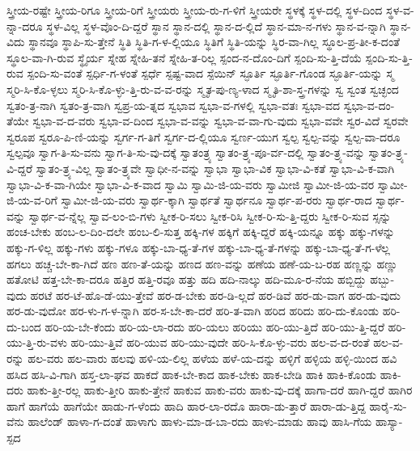 {ಸ್ತ್ರೀಯ-ರಷ್ಟೇ
ಸ್ತ್ರೀಯ-ರಿಗೂ
ಸ್ತ್ರೀಯ-ರಿಗೆ
ಸ್ತ್ರೀಯರು
ಸ್ತ್ರೀಯ-ರು-ಗ-ಳಿಗೆ
ಸ್ತ್ರೀಯರೇ
ಸ್ಥಳಕ್ಕೆ
ಸ್ಥಳ-ದಲ್ಲಿ
ಸ್ಥಳ-ದಿಂದ
ಸ್ಥಳ-ವ-ನ್ನಾ-ದರೂ
ಸ್ಥಳ-ವಿಲ್ಲ
ಸ್ಥಳ-ವೊಂ-ದಿ-ದ್ದರೆ
ಸ್ಥಾನ
ಸ್ಥಾನ-ದಲ್ಲಿ
ಸ್ಥಾನ-ದ-ಲ್ಲಿದೆ
ಸ್ಥಾನ-ಮಾ-ನ-ಗಳು
ಸ್ಥಾನ-ವ-ನ್ನಾಗಿ
ಸ್ಥಾನ-ವಿದು
ಸ್ಥಾನವೂ
ಸ್ಥಾಪಿ-ಸು-ತ್ತೇನೆ
ಸ್ಥಿತಿ
ಸ್ಥಿತಿ-ಗ-ಳ-ಲ್ಲಿಯೂ
ಸ್ಥಿತಿಗೆ
ಸ್ಥಿತಿ-ಯನ್ನು
ಸ್ಥಿರ-ವಾ-ಗಿಲ್ಲ
ಸ್ಥೂಲ-ಪ್ರ-ತೀ-ಕ-ದಂತೆ
ಸ್ಥೂಲ-ವಾ-ಗಿ-ರುವ
ಸ್ಥೈರ್ಯ
ಸ್ನೇಹ
ಸ್ನೇಹಿ-ತನೆ
ಸ್ನೇಹಿ-ತ-ರಿಲ್ಲ
ಸ್ಪಂದ-ನ-ದೊಂ-ದಿಗೆ
ಸ್ಪಂದಿ-ಸು-ತ್ತಿ-ದೆಯೆ
ಸ್ಪಂದಿ-ಸು-ತ್ತಿ-ರುವ
ಸ್ಪಂದಿ-ಸು-ವಂತೆ
ಸ್ಪರ್ಧಿ-ಗ-ಳಂತೆ
ಸ್ಪರ್ಧೆ
ಸ್ಪಷ್ಟ-ವಾದ
ಸ್ಪೆಯಿನ್
ಸ್ಫೂರ್ತಿ
ಸ್ಫೂರ್ತಿ-ಗೊಂಡ
ಸ್ಫೂರ್ತಿ-ಯನ್ನು
ಸ್ಮ
ಸ್ಮರಿ-ಸಿ-ಕೊ-ಳ್ಳಲು
ಸ್ಮರಿ-ಸಿ-ಕೊ-ಳ್ಳು-ತ್ತಿ-ರು-ವ-ವ-ರನ್ನು
ಸ್ಮೃತ-ಪು-ಣ್ಯ-ಳಾದ
ಸ್ಮೃತಿ-ಶಾ-ಸ್ತ್ರ-ಗಳನ್ನು
ಸ್ವ
ಸ್ವಂತ
ಸ್ವಚ್ಛಂದ
ಸ್ವತಂ-ತ್ರ-ನಾಗಿ
ಸ್ವತಂ-ತ್ರ-ವಾಗಿ
ಸ್ವಪ್ರ-ಯ-ತ್ನದ
ಸ್ವಭಾವ
ಸ್ವಭಾ-ವ-ಗಳಲ್ಲಿ
ಸ್ವಭಾ-ವತಃ
ಸ್ವಭಾ-ವದ
ಸ್ವಭಾ-ವ-ದಂ-ತೆಯೇ
ಸ್ವಭಾ-ವ-ದ-ವರು
ಸ್ವಭಾ-ವ-ದಿಂದ
ಸ್ವಭಾ-ವ-ವನ್ನು
ಸ್ವಭಾ-ವ-ವಾ-ಗು-ವುದು
ಸ್ವಭಾ-ವವೇ
ಸ್ವರ-ವಿದೆ
ಸ್ವರವೇ
ಸ್ವರೂಪ
ಸ್ವರೂ-ಪಿ-ಣಿ-ಯನ್ನು
ಸ್ವರ್ಗ-ಗ-ತಿಗೆ
ಸ್ವರ್ಗ-ದ-ಲ್ಲಿಯೂ
ಸ್ವರ್ಣ-ಯುಗ
ಸ್ವಲ್ಪ
ಸ್ವಲ್ಪ-ವನ್ನು
ಸ್ವಲ್ಪ-ವಾ-ದರೂ
ಸ್ವಲ್ಪವೂ
ಸ್ವಾಗ-ತಿ-ಸು-ವನು
ಸ್ವಾಗ-ತಿ-ಸು-ವು-ದಕ್ಕೆ
ಸ್ವಾತಂತ್ರ್ಯ
ಸ್ವಾತಂ-ತ್ರ್ಯ-ಪೂ-ರ್ವ-ದಲ್ಲಿ
ಸ್ವಾತಂ-ತ್ರ್ಯ-ವನ್ನು
ಸ್ವಾತಂ-ತ್ರ್ಯ-ವಿ-ದ್ದರೆ
ಸ್ವಾತಂ-ತ್ರ್ಯ-ವಿಲ್ಲ
ಸ್ವಾತಂ-ತ್ರ್ಯವೇ
ಸ್ವಾಧೀ-ನ-ವನ್ನು
ಸ್ವಾಭಾ
ಸ್ವಾಭಾ-ವಿಕ
ಸ್ವಾಭಾ-ವಿ-ಕತೆ
ಸ್ವಾಭಾ-ವಿ-ಕ-ವಾಗಿ
ಸ್ವಾಭಾ-ವಿ-ಕ-ವಾ-ಗಿಯೇ
ಸ್ವಾಭಾ-ವಿ-ಕ-ವಾದ
ಸ್ವಾಮಿ
ಸ್ವಾಮಿ-ಜಿ-ಯ-ವರು
ಸ್ವಾಮೀಜಿ
ಸ್ವಾಮೀ-ಜಿ-ಯ-ವರ
ಸ್ವಾಮೀ-ಜಿ-ಯ-ವ-ರಿಗೆ
ಸ್ವಾಮೀ-ಜಿ-ಯ-ವರು
ಸ್ವಾರ್ಥ-ಕ್ಕಾಗಿ
ಸ್ವಾರ್ಥತೆ
ಸ್ವಾರ್ಥನೂ
ಸ್ವಾರ್ಥ-ಪ-ರರು
ಸ್ವಾರ್ಥ-ರಾದ
ಸ್ವಾರ್ಥ-ವನ್ನು
ಸ್ವಾರ್ಥ-ವ-ನ್ನೆಲ್ಲ
ಸ್ವಾವ-ಲಂ-ಬಿ-ಗಳು
ಸ್ವೀಕ-ರಿ-ಸಲು
ಸ್ವೀಕ-ರಿಸಿ
ಸ್ವೀಕ-ರಿ-ಸು-ತ್ತಿ-ದ್ದರು
ಸ್ವೀಕ-ರಿ-ಸುವ
ಸ್ಸನ್ನು
ಹಂಚ-ಬೇಕು
ಹಂಬ-ಲ-ದಿಂ-ದಲೇ
ಹಂಬ-ಲಿ-ಸುತ್ತ
ಹಕ್ಕಿ-ಗಳ
ಹಕ್ಕಿಗೆ
ಹಕ್ಕಿ-ದ್ದರೆ
ಹಕ್ಕಿ-ಯನ್ನೂ
ಹಕ್ಕು
ಹಕ್ಕು-ಗಳನ್ನು
ಹಕ್ಕು-ಗ-ಳಿಲ್ಲ
ಹಕ್ಕು-ಗಳು
ಹಕ್ಕು-ಗಳೂ
ಹಕ್ಕು-ಬಾ-ಧ್ಯ-ತೆ-ಗಳ
ಹಕ್ಕು-ಬಾ-ಧ್ಯ-ತೆ-ಗಳನ್ನು
ಹಕ್ಕು-ಬಾ-ಧ್ಯ-ತೆ-ಗ-ಳೆಲ್ಲ
ಹಗಲು
ಹಚ್ಚ-ಬೇ-ಕಾ-ಗಿದೆ
ಹಣ
ಹಣ-ತೆ-ಯನ್ನು
ಹಣದ
ಹಣ-ವನ್ನು
ಹಣೆಯ
ಹಣೆ-ಯ-ಬ-ರಹ
ಹಣ್ಣನ್ನು
ಹಣ್ಣು
ಹತೋಟಿ
ಹತ್ತ-ಬೇ-ಕಾ-ದರೂ
ಹತ್ತಿರ
ಹತ್ತಿ-ರವೂ
ಹತ್ತು
ಹದಿ
ಹದಿ-ನಾಲ್ಕು
ಹದಿ-ಮೂ-ರ-ನೆಯ
ಹಬ್ಬಿದ್ದು
ಹಬ್ಬು-ವುದು
ಹರಟೆ
ಹರ-ಟೆ-ಹೊ-ಡೆ-ಯು-ತ್ತೇವೆ
ಹರ-ಡ-ಬೇಕು
ಹರ-ಡಿ-ಲ್ಲದೆ
ಹರ-ಡಿವೆ
ಹರ-ಡು-ವಾಗ
ಹರ-ಡು-ವುದು
ಹರ-ಡು-ವುದೋ
ಹರ-ಳು-ಗ-ಳ-ನ್ನಾಗಿ
ಹರ-ಸ-ಬೇ-ಕಾ-ದರೆ
ಹರಿ-ತ-ವಾಗಿ
ಹರಿದ
ಹರಿದು
ಹರಿ-ದು-ಕೊಂಡು
ಹರಿ-ದು-ಬಂದ
ಹರಿ-ಯ-ಬೇ-ಕೆಂದು
ಹರಿ-ಯ-ಲಾ-ರದು
ಹರಿ-ಯಲು
ಹರಿಯು
ಹರಿ-ಯು-ತ್ತಿದೆ
ಹರಿ-ಯು-ತ್ತಿ-ದ್ದರೆ
ಹರಿ-ಯು-ತ್ತಿ-ರು-ವಳು
ಹರಿ-ಯು-ತ್ತಿವೆ
ಹರಿ-ಯುವ
ಹರಿ-ಯು-ವುದೇ
ಹರಿ-ಸಿ-ಕೊ-ಳ್ಳು-ವರು
ಹಲ-ವ-ದ-ರಂತೆ
ಹಲ-ವ-ರನ್ನು
ಹಲ-ವರು
ಹಲ-ವಾರು
ಹಲವು
ಹಳಿ-ಯ-ಲಿಲ್ಲ
ಹಳೆಯ
ಹಳೆ-ಯ-ದನ್ನು
ಹಳ್ಳಿಗೆ
ಹಳ್ಳಿಯ
ಹಳ್ಳಿ-ಯಿಂದ
ಹವಿ
ಹಸಿದ
ಹಸಿ-ವಿ-ಗಾಗಿ
ಹಸ್ತ-ಲಾ-ಘವ
ಹಾಕದೆ
ಹಾಕ-ಬೇ-ಕಾದ
ಹಾಕ-ಬೇಕು
ಹಾಕ-ಬೇಡಿ
ಹಾಕಿ
ಹಾಕಿ-ಕೊಂಡು
ಹಾಕಿ-ದರು
ಹಾಕು-ತ್ತೀ-ರಲ್ಲ
ಹಾಕು-ತ್ತೀರಿ
ಹಾಕು-ತ್ತೇನೆ
ಹಾಕುವ
ಹಾಕು-ವರು
ಹಾಕು-ವು-ದಕ್ಕೆ
ಹಾಗಾ-ದರೆ
ಹಾಗಿ-ದ್ದರೆ
ಹಾಗಿರ
ಹಾಗೆ
ಹಾಗೆಯೆ
ಹಾಗೆಯೇ
ಹಾಡು-ಗ-ಳೆಂದು
ಹಾದಿ
ಹಾರ-ಲಾ-ರದೊ
ಹಾರಾ-ಡು-ತ್ತಾರೆ
ಹಾರಾ-ಡು-ತ್ತಿದ್ದ
ಹಾರೈ-ಸು-ವೆನು
ಹಾಲೆಂಡ್
ಹಾಳಾ-ಗ-ದಂತೆ
ಹಾಳಾಗು
ಹಾಳು-ಮಾ-ಡ-ಬಾ-ರದು
ಹಾಳು-ಮಾಡು
ಹಾವು
ಹಾಸಿ-ಗೆಯ
ಹಾಸ್ಯಾ-ಸ್ಪದ
}
